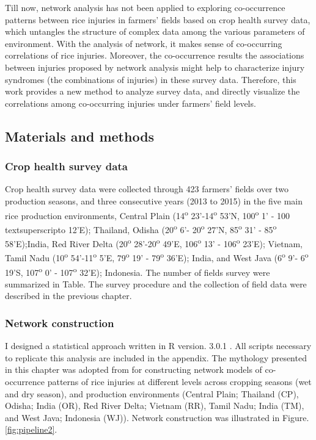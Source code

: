 Till now, network analysis has not been applied to exploring co-occurrence patterns between rice injuries in farmers’ fields based on crop health survey data, which untangles the structure of complex data among the various parameters of environment. With the analysis of network, it makes sense of co-occurring correlations of rice injuries. Moreover, the co-occurrence results the associations between injuries proposed by network analysis might help to characterize  injury syndromes (the combinations of injuries) in these survey data. Therefore, this work provides a new method to analyze survey data, and directly visualize the correlations among co-occurring injuries under farmers’ field levels.

\subsection{Materials and methods} 

\subsubsection{Crop health survey data}
Crop health survey data were collected through 423 farmers’ fields over two production seasons, and three consecutive years (2013 to 2015) in the five main rice production environments, Central Plain (14\textsuperscript{o} 23’-14\textsuperscript{o} 53’N, 100\textsuperscript{o} 1’ - 100 textsuperscript{o} 12’E); Thailand, Odisha (20\textsuperscript{o} 6’- 20\textsuperscript{o} 27’N, 85\textsuperscript{o} 31’ - 85\textsuperscript{o} 58’E);India, Red River Delta (20\textsuperscript{o} 28’-20\textsuperscript{o} 49’E, 106\textsuperscript{o} 13’ - 106\textsuperscript{o}  23’E); Vietnam, Tamil Nadu (10\textsuperscript{o} 54’-11\textsuperscript{o} 5’E, 79\textsuperscript{o} 19’ - 79\textsuperscript{o}  36’E); India, and West Java (6\textsuperscript{o} 9’- 6\textsuperscript{o} 19’S, 107\textsuperscript{o} 0’ - 107\textsuperscript{o}  32’E); Indonesia. The number of fields survey were summarized in Table. The survey procedure and the collection of field data were described in  the previous chapter.


\subsubsection{Network construction}
I designed a statistical approach written in R version. 3.0.1 \citep{R_2015}. All scripts necessary to replicate this analysis are included in the appendix. The mythology presented in this chapter was adopted from \citet{Williams_2014_demonstrating} for constructing network models of co-occurrence patterns of rice injuries at different levels across cropping seasons (wet and dry season), and production environments (Central Plain; Thailand (CP), Odisha; India (OR), Red River Delta; Vietnam (RR), Tamil Nadu; India (TM), and West Java; Indonesia (WJ)). Network construction was illustrated in Figure.\ref{fig:pipeline2}.

